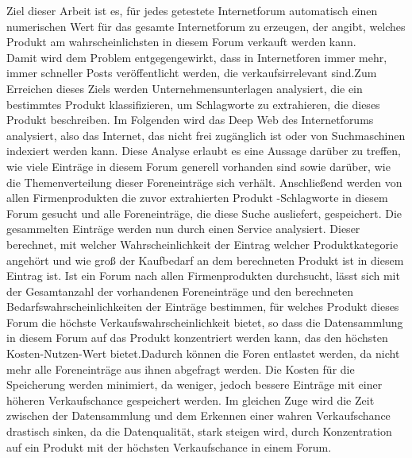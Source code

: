 \documentclass[%
a4paper,
DIV12, 
2.5headlines, 
bigheadings, 
titlepage, 
openbib,
]{scrartcl}
\newcommand{\mainmatter}{\pagenumbering{arabic}\setcounter{page}{1}}
\begin{document}
{%
Ziel dieser Arbeit ist es, für jedes getestete Internetforum automatisch einen numerischen Wert für das gesamte Internetforum zu erzeugen, der angibt, welches Produkt am wahrscheinlichsten in diesem Forum verkauft werden kann.\\  Damit wird dem Problem entgegengewirkt, dass in Internetforen immer mehr, immer schneller Posts veröffentlicht werden, die verkaufsirrelevant sind.Zum Erreichen dieses Ziels werden Unternehmensunterlagen analysiert, die ein bestimmtes Produkt klassifizieren, um Schlagworte zu extrahieren, die dieses Produkt beschreiben. Im Folgenden wird das Deep Web des Internetforums analysiert, also das Internet, das nicht frei zugänglich ist oder von Suchmaschinen indexiert werden kann.  Diese Analyse erlaubt es eine Aussage darüber zu treffen, wie viele Einträge in diesem Forum generell vorhanden sind sowie darüber, wie die Themenverteilung dieser Foreneinträge sich verhält. Anschließend werden von allen Firmenprodukten die zuvor extrahierten Produkt -Schlagworte in diesem Forum gesucht und alle Foreneinträge, die diese Suche ausliefert, gespeichert. Die gesammelten Einträge werden nun durch einen Service analysiert.  Dieser berechnet, mit welcher Wahrscheinlichkeit der Eintrag welcher Produktkategorie angehört und wie groß der Kaufbedarf an dem berechneten Produkt ist in diesem Eintrag ist. Ist ein Forum nach allen Firmenprodukten durchsucht, lässt sich mit der Gesamtanzahl der vorhandenen Foreneinträge und den berechneten Bedarfswahrscheinlichkeiten der Einträge bestimmen, für welches Produkt dieses Forum die höchste Verkaufswahrscheinlichkeit bietet, so dass die Datensammlung in diesem Forum auf das Produkt konzentriert werden kann, das den höchsten Kosten-Nutzen-Wert bietet.Dadurch können die Foren entlastet werden, da nicht mehr alle Foreneinträge aus ihnen abgefragt werden. Die Kosten für die Speicherung werden minimiert, da weniger, jedoch bessere Einträge mit einer höheren Verkaufschance gespeichert werden. Im gleichen Zuge wird die Zeit zwischen der Datensammlung und dem Erkennen einer wahren Verkaufschance drastisch sinken, da die Datenqualität, stark steigen wird, durch Konzentration auf ein Produkt mit der höchsten Verkaufschance in einem Forum.}
	
	\tableofcontents
	\clearpage
	\mainmatter

	
	
	
	
	
	
		
	\clearpage
	
	
	
\end{document}
